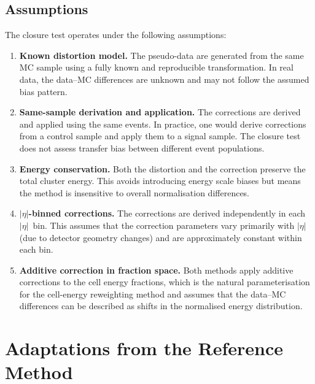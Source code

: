 \documentclass[12pt,a4paper]{article}
\begin{document}
\subsection{Assumptions}
\label{sec:method:assumptions}

The closure test operates under the following assumptions:

\begin{enumerate}
  \item \textbf{Known distortion model.} The pseudo-data are generated from
    the same MC sample using a fully known and reproducible transformation.
    In real data, the data--MC differences are unknown and may not follow the
    assumed bias pattern.
  \item \textbf{Same-sample derivation and application.} The corrections are
    derived and applied using the same events. In practice, one would derive
    corrections from a control sample and apply them to a signal sample. The
    closure test does not assess transfer bias between different event
    populations.
  \item \textbf{Energy conservation.} Both the distortion and the correction
    preserve the total cluster energy. This avoids introducing energy scale
    biases but means the method is insensitive to overall normalisation
    differences.
  \item \textbf{$|\eta|$-binned corrections.} The corrections are derived
    independently in each $|\eta|$~bin. This assumes that the correction
    parameters vary primarily with $|\eta|$ (due to detector geometry changes)
    and are approximately constant within each bin.
  \item \textbf{Additive correction in fraction space.} Both methods apply
    additive corrections to the cell energy fractions, which is the natural
    parameterisation for the cell-energy reweighting method and assumes that
    the data--MC differences can be described as shifts in the normalised
    energy distribution.
\end{enumerate}

\section{Adaptations from the Reference Method}
\label{sec:adaptations}
\end{document}
